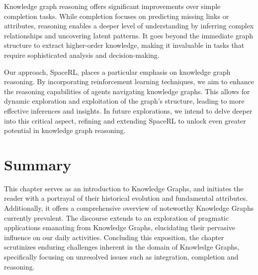Knowledge graph reasoning offers significant improvements over simple completion tasks. While completion focuses on predicting missing links or attributes, reasoning enables a deeper level of understanding by inferring complex relationships and uncovering latent patterns. It goes beyond the immediate graph structure to extract higher-order knowledge, making it invaluable in tasks that require sophisticated analysis and decision-making.

Our approach, SpaceRL, places a particular emphasis on knowledge graph reasoning. By incorporating reinforcement learning techniques, we aim to enhance the reasoning capabilities of agents navigating knowledge graphs. This allows for dynamic exploration and exploitation of the graph's structure, leading to more effective inferences and insights. In future explorations, we intend to delve deeper into this critical aspect, refining and extending SpaceRL to unlock even greater potential in knowledge graph reasoning.

\section{Summary}\label{sec:kgs-summary}
This chapter serves as an introduction to Knowledge Graphs, and initiates the reader with a portrayal of their historical evolution and fundamental attributes. Additionally, it offers a comprehensive overview of noteworthy Knowledge Graphs currently prevalent. The discourse extends to an exploration of pragmatic applications emanating from Knowledge Graphs, elucidating their pervasive influence on our daily activities. Concluding this exposition, the chapter scrutinizes enduring challenges inherent in the domain of Knowledge Graphs, specifically focusing on unresolved issues such as integration, completion and reasoning.
